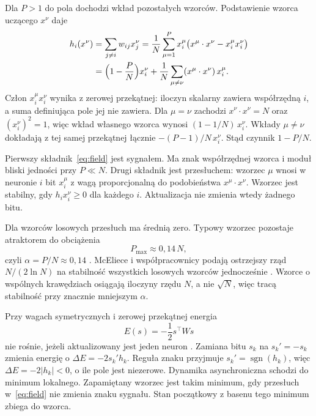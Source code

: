 \documentclass[11pt,a4paper]{article}
\begin{document}
Dla \(P > 1\) do pola dochodzi wkład pozostałych wzorców. Podstawienie wzorca uczącego \(x^{\nu}\) daje
\begin{align}
    h_i(x^{\nu})
    &= \sum_{j \neq i} w_{ij} x_j^{\nu}
    = \frac{1}{N}\sum_{\mu=1}^{P} x_i^{\mu}\bigl(x^{\mu}\cdot x^{\nu} - x_i^{\mu} x_i^{\nu}\bigr) \nonumber \\
    &= \Bigl(1 - \frac{P}{N}\Bigr) x_i^{\nu}
     + \frac{1}{N}\sum_{\mu \neq \nu} (x^{\mu}\cdot x^{\nu})\, x_i^{\mu}.
    \label{eq:field}
\end{align}
Człon \(x_i^{\mu} x_i^{\nu}\) wynika z zerowej przekątnej: iloczyn skalarny zawiera współrzędną \(i\), a suma definiująca pole jej nie zawiera. Dla \(\mu = \nu\) zachodzi \(x^{\nu}\cdot x^{\nu} = N\) oraz \((x_i^{\nu})^2 = 1\), więc wkład własnego wzorca wynosi \((1 - 1/N)\, x_i^{\nu}\). Wkłady \(\mu \neq \nu\) dokładają z tej samej przekątnej łącznie \(-(P-1)/N\, x_i^{\nu}\). Stąd czynnik \(1 - P/N\).

Pierwszy składnik~\eqref{eq:field} jest sygnałem. Ma znak współrzędnej wzorca i moduł bliski jedności przy \(P \ll N\). Drugi składnik jest przesłuchem: wzorzec \(\mu\) wnosi w neuronie \(i\) bit \(x_i^{\mu}\) z wagą proporcjonalną do podobieństwa \(x^{\mu}\cdot x^{\nu}\). Wzorzec jest stabilny, gdy \(h_i x_i^{\nu} \ge 0\) dla każdego \(i\). Aktualizacja nie zmienia wtedy żadnego bitu.

Dla wzorców losowych przesłuch ma średnią zero. Typowy wzorzec pozostaje atraktorem do obciążenia
\begin{equation}
    P_{\max} \approx 0{,}14\, N,
\end{equation}
czyli \(\alpha = P/N \approx 0{,}14\) \cite{amit1985,amit1987}. McEliece i współpracownicy podają ostrzejszy rząd \(N/(2\ln N)\) na stabilność wszystkich losowych wzorców jednocześnie \cite{mceliece1987}. Wzorce o wspólnych krawędziach osiągają iloczyny rzędu \(N\), a nie \(\sqrt{N}\), więc tracą stabilność przy znacznie mniejszym \(\alpha\).

Przy wagach symetrycznych i zerowej przekątnej energia
\begin{equation}
\label{eq:energy}
    E(s) = -\frac12 s^{\top} W s
\end{equation}
nie rośnie, jeżeli aktualizowany jest jeden neuron \cite{hopfield1982}. Zamiana bitu \(s_k\) na \(s_k' = -s_k\) zmienia energię o \(\Delta E = -2 s_k' h_k\). Reguła znaku przyjmuje \(s_k' = \operatorname{sgn}(h_k)\), więc \(\Delta E = -2|h_k| < 0\), o ile pole jest niezerowe. Dynamika asynchroniczna schodzi do minimum lokalnego. Zapamiętany wzorzec jest takim minimum, gdy przesłuch w~\eqref{eq:field} nie zmienia znaku sygnału. Stan początkowy z basenu tego minimum zbiega do wzorca.
\end{document}
